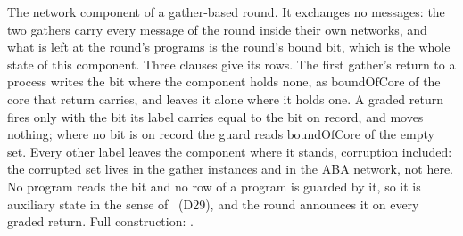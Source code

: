 \begin{definition}
  \label{def:aba-gbca-net}
  \leanok
  The network component of a gather-based round.
  It exchanges no messages: the two gathers carry every message of the round inside their own networks, and what is left at the round's programs is the round's bound bit, which is the whole state of this component.
  Three clauses give its rows.
  The first gather's return to a process writes the bit where the component holds none, as $\mathrm{boundOfCore}$ of the core that return carries, and leaves it alone where it holds one.
  A graded return fires only with the bit its label carries equal to the bit on record, and moves nothing; where no bit is on record the guard reads $\mathrm{boundOfCore}$ of the empty set.
  Every other label leaves the component where it stands, corruption included: the corrupted set lives in the gather instances and in the ABA network, not here.
  No program reads the bit and no row of a program is guarded by it, so it is auxiliary state in the sense of~\cite{AL91} (D29), and the round announces it on every graded return.
  Full construction: .
\end{definition}

